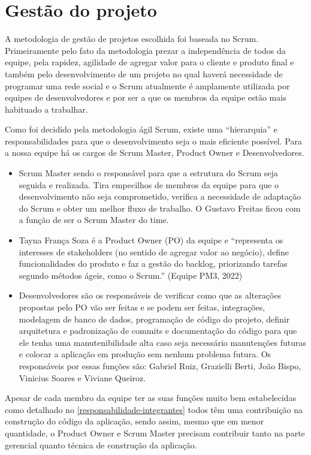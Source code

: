 \chapter{Gestão do projeto}

A metodologia de gestão de projetos escolhida foi baseada no Scrum. Primeiramente pelo fato da metodologia prezar a independência de todos da equipe, pela rapidez, agilidade de agregar valor para o cliente e produto final e também pelo desenvolvimento de um projeto no qual haverá necessidade de programar uma rede social e o Scrum atualmente é amplamente utilizada por equipes de desenvolvedores e por ser a que os membros da equipe estão mais habituado a trabalhar.

Como foi decidido pela metodologia ágil Scrum, existe uma “hierarquia” e responsabilidades para que o desenvolvimento seja o mais eficiente possível. Para a nossa equipe há os cargos de Scrum Master, Product Owner e Desenvolvedores.

\begin{itemize}
	\item Scrum Master sendo o responsável para que a estrutura do Scrum seja seguida e realizada. Tira empecilhos de membros da equipe para que o desenvolvimento não seja comprometido, verifica a necessidade de adaptação do Scrum e obter um melhor fluxo de trabalho. O Gustavo Freitas ficou com a função de ser o Scrum Master do time.
	
	\item Tayna França Soza é a Product Owner (PO) da equipe e “representa os interesses de stakeholders (no sentido de agregar valor ao negócio), define funcionalidades do produto e faz a gestão do backlog, priorizando tarefas segundo métodos ágeis, como o Scrum.” (Equipe PM3, 2022)
	
	\item Desenvolvedores são os responsáveis de verificar como que as alterações propostas pelo PO vão ser feitas e se podem ser feitas, integrações, modelagem de banco de dados, programação de código do projeto, definir arquitetura e padronização de commits e documentação do código para que ele tenha uma manutenibilidade alta caso seja necessário manutenções futuras e colocar a aplicação em produção sem nenhum problema futura. Os responsáveis por essas funções são: Gabriel Ruiz, Grazielli Berti, João Bispo, Vinicius Soares e Viviane Queiroz.
	
\end{itemize}

Apesar de cada membro da equipe ter as suas funções muito bem estabelecidas como detalhado no \autoref{responsabilidade-integrantes} todos têm uma contribuição na construção do código da aplicação, sendo assim, mesmo que em menor quantidade, o Product Owner e Scrum Master precisam contribuir tanto na parte gerencial quanto técnica de construção da aplicação. 

